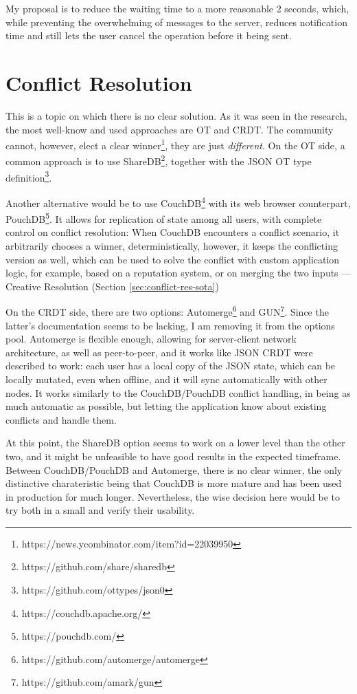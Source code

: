 My proposal is to reduce the waiting time to a more reasonable 2 seconds, which, while preventing the overwhelming of messages to the server, reduces notification time and still lets the user cancel the operation before it being sent.

\section{Conflict Resolution} \label{sec:prob-solution-conflict-res}
This is a topic on which there is no clear solution. As it was seen in the research, the most well-know and used approaches are OT and CRDT. The community cannot, however, elect a clear winner\footnote{https://news.ycombinator.com/item?id=22039950}, they are just \textit{different}. On the OT side, a common approach is to use ShareDB\footnote{https://github.com/share/sharedb}, together with the JSON OT type definition\footnote{https://github.com/ottypes/json0}.

Another alternative would be to use CouchDB\footnote{https://couchdb.apache.org/} with its web browser counterpart, PouchDB\footnote{https://pouchdb.com/}. It allows for replication of state among all users, with complete control on conflict resolution: When CouchDB encounters a conflict scenario, it arbitrarily chooses a winner, deterministically, however, it keeps the conflicting version as well, which can be used to solve the conflict with custom application logic, for example, based on a reputation system, or on merging the two inputs --- Creative Resolution (Section \ref{sec:conflict-res-sota})

On the CRDT side, there are two options: Automerge\footnote{https://github.com/automerge/automerge} and GUN\footnote{https://github.com/amark/gun}. Since the latter's documentation seems to be lacking, I am removing it from the options pool. Automerge is flexible enough, allowing for server-client network architecture, as well as peer-to-peer, and it works like JSON CRDT were described to work: each user has a local copy of the JSON state, which can be locally mutated, even when offline, and it will sync automatically with other nodes. It works similarly to the CouchDB/PouchDB conflict handling, in being as much automatic as possible, but letting the application know about existing conflicts and handle them.

At this point, the ShareDB option seems to work on a lower level than the other two, and it might be unfeasible to have good results in the expected timeframe. Between CouchDB/PouchDB and Automerge, there is no clear winner, the only distinctive charateristic being that CouchDB is more mature and has been used in production for much longer. Nevertheless, the wise decision here would be to try both in a small  and verify their usability. 


